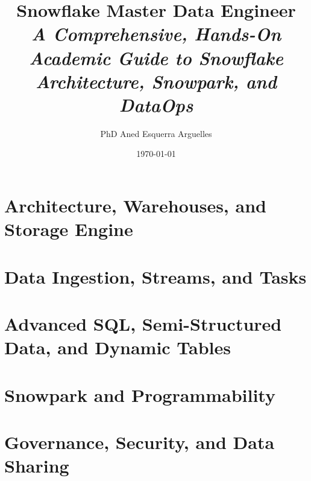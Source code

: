 \documentclass[11pt,a4paper,oneside]{book}
\title{\Huge \textbf{Snowflake Master Data Engineer}\\[1em]
\Large \textit{A Comprehensive, Hands-On Academic Guide to Snowflake Architecture, Snowpark, and DataOps}}
\author{PhD Aned Esquerra Arguelles}
\date{\today}
\begin{document}
\frontmatter



\tableofcontents
\listoffigures
\listoftables

\mainmatter

\setcounter{chapter}{-1}


\part{Architecture, Warehouses, and Storage Engine}





\part{Data Ingestion, Streams, and Tasks}





\part{Advanced SQL, Semi-Structured Data, and Dynamic Tables}





\part{Snowpark and Programmability}





\part{Governance, Security, and Data Sharing}




\end{document}

